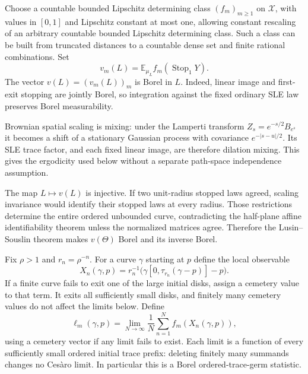 \documentclass[11pt]{article}
\theoremstyle{definition}\newtheorem{definition}[theorem]{Definition}
\theoremstyle{remark}\newtheorem{remark}[theorem]{Remark}
\begin{document}
Choose a countable bounded Lipschitz determining class
$(f_m)_{m\geq1}$ on $\mathcal X$, with values in $[0,1]$ and Lipschitz
constant at most one, allowing constant rescaling of an arbitrary
countable bounded Lipschitz determining class. Such a class can be built
from truncated distances to a countable dense set and finite rational
combinations. Set
\[
 v_m(L)=\mathbb E_{\mu_L}
       f_m(\operatorname{Stop}_1Y).
 \tag{ED2}
\]
The vector $v(L)=(v_m(L))_m$ is Borel in $L$. Indeed, linear image and
first-exit stopping are jointly Borel, so integration against the fixed
ordinary SLE law preserves Borel measurability.

Brownian spatial scaling is mixing: under the Lamperti transform
$Z_s=e^{-s/2}B_{e^s}$ it becomes a shift of a stationary Gaussian process
with covariance $e^{-|s-u|/2}$. Its SLE trace factor, and each fixed
linear image, are therefore dilation mixing. This gives the ergodicity
used below without a separate path-space independence assumption.

The map $L\mapsto v(L)$ is injective. If two unit-radius stopped laws
agreed, scaling invariance would identify their stopped laws at every
radius. Those restrictions determine the entire ordered unbounded curve,
contradicting the half-plane affine identifiability theorem unless the
normalized matrices agree. Therefore the Lusin--Souslin theorem makes
$v(\Theta)$ Borel and its inverse Borel.

Fix $\rho>1$ and $r_n=\rho^{-n}$. For a curve $\gamma$ starting at
$p$ define the local observable
\[
 X_n(\gamma,p)=r_n^{-1}
       \bigl(\gamma[0,\tau_{r_n}(\gamma-p)]-p\bigr).
 \tag{ED3}
\]
If a finite curve fails to exit one of the large initial disks, assign a
cemetery value to that term. It exits all sufficiently small disks, and
finitely many cemetery values do not affect the limits below.
Define
\[
 \ell_m(\gamma,p)=\lim_{N\to\infty}
       \frac1N\sum_{n=1}^N f_m(X_n(\gamma,p)),
 \tag{ED4}
\]
using a cemetery vector if any limit fails to exist. Each limit is a
function of every sufficiently small ordered initial trace prefix:
deleting finitely many summands changes no Ces\`aro limit. In particular
this is a Borel ordered-trace-germ statistic.
\end{document}
